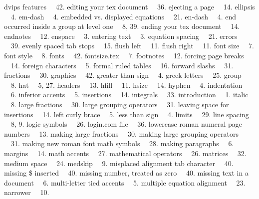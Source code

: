 {dvips features \ \leaderfill \  42.
\bigskip
editing your tex document \ \leaderfill \  36.
ejecting a page \ \leaderfill \  14.
ellipsis \ \leaderfill \  4.
em-dash \ \leaderfill \  4.
embedded vs. displayed equations \ \leaderfill \  21.
en-dash \ \leaderfill \  4.
end occurred inside a group at level one \ \leaderfill \  8, 39.
ending your tex document \ \leaderfill \  14.
endnotes \ \leaderfill \  12.
enspace \ \leaderfill \  3.
entering text \ \leaderfill \  3.
equation spacing \ \leaderfill \  21.
errors \ \leaderfill \  39.
evenly spaced tab stops \ \leaderfill \  15.
\bigskip
flush left \ \leaderfill \  11.
flush right \ \leaderfill \  11.
font size \ \leaderfill \  7.
font style \ \leaderfill \  8.
fonts \ \leaderfill \  42.
fontsize.tex \ \leaderfill \  7.
footnotes \ \leaderfill \  12.
forcing page breaks \ \leaderfill \  14.
foreign characters \ \leaderfill \  5.
formal ruled tables \ \leaderfill \  16.
forward slashs \ \leaderfill \  31.
fractions \ \leaderfill \  30.
\bigskip
graphics \ \leaderfill \  42.
greater than sign \ \leaderfill \  4.
greek letters \ \leaderfill \  25.
group \ \leaderfill \  8.
\bigskip
hat \ \leaderfill \  5, 27.
headers \ \leaderfill \  13.
hfill \ \leaderfill \  11.
hsize \ \leaderfill \  14.
hyphen \ \leaderfill \  4.
\bigskip
indentation \ \leaderfill \  6.
inferior accents \ \leaderfill \  5.
insertions \ \leaderfill \  14.
integrals \ \leaderfill \  33.
introduction \ \leaderfill \  1.
italic \ \leaderfill \  8.
\bigskip
large fractions \ \leaderfill \  30.
large grouping operators \ \leaderfill \  31.
leaving space for insertions \ \leaderfill \  14.
left curly brace \ \leaderfill \  5.
less than sign \ \leaderfill \  4.
limits \ \leaderfill \  29.
line spacing \ \leaderfill \  8, 9.
logic symbols \ \leaderfill \  26.
login.com file \ \leaderfill \  36.
lowercase roman numeral page numbers \ \leaderfill \  13.
\bigskip
making large fractions \ \leaderfill \  30.
making large grouping operators \ \leaderfill \  31.
making new roman font math symbols \ \leaderfill \  28.
making paragraphs \ \leaderfill \  6.
margins \ \leaderfill \  14.
math accents \ \leaderfill \  27.
mathematical operators \ \leaderfill \  26.
matrices \ \leaderfill \  32.
medium space \ \leaderfill \  24.
medskip \ \leaderfill \  9.
misplaced alignment tab character \ \leaderfill \  40.
missing \$ inserted \ \leaderfill \  40.
missing number, treated as zero \ \leaderfill \  40.
missing text in a document \ \leaderfill \  6.
multi-letter tied accents \ \leaderfill \  5.
multiple equation alignment \ \leaderfill \  23.
\bigskip
narrower \ \leaderfill \  10.
}
